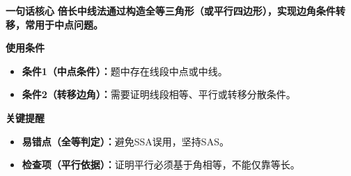 \begin{summarybox}
	\textbf{\textcolor{CSummary}{一句话核心}}
	\textbf{倍长中线法通过构造全等三角形（或平行四边形），实现边角条件转移，常用于中点问题。}

	\medskip
	\textbf{\textcolor{CSummary}{使用条件}}
	\begin{itemize}[leftmargin=*, itemsep=0.5em, topsep=0.4em]
		\item \textbf{条件1（中点条件）：}题中存在线段中点或中线。
		\item \textbf{条件2（转移边角）：}需要证明线段相等、平行或转移分散条件。
	\end{itemize}

	\medskip
	\textbf{\textcolor{CSummary}{关键提醒}}
	\begin{itemize}[leftmargin=*, itemsep=0.5em, topsep=0.4em]
		\item \textbf{易错点（全等判定）：}避免SSA误用，坚持SAS。
		\item \textbf{检查项（平行依据）：}证明平行必须基于角相等，不能仅靠等长。
	\end{itemize}

\end{summarybox}
